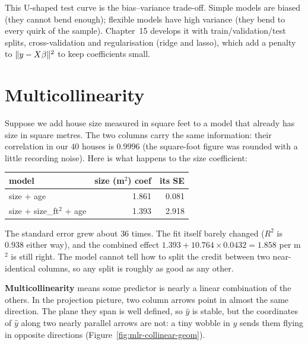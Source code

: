 \begin{connectionbox}
This U-shaped test curve is the bias--variance trade-off. Simple models are biased (they
cannot bend enough); flexible models have high variance (they bend to every quirk of the
sample). Chapter~15 develops it with train/validation/test splits, cross-validation and
regularisation (ridge and lasso), which add a penalty to $\lVert y - X\beta\rVert^2$ to keep
coefficients small.
\end{connectionbox}

\section{Multicollinearity}
\label{sec:mlr-collinear}

Suppose we add house size measured in square feet to a model that already has size in
square metres. The two columns carry the same information: their correlation in our
$40$ houses is $0.9996$ (the square-foot figure was rounded with a little recording
noise). Here is what happens to the size coefficient:

\begin{center}
\begin{tabular}{lrr}
\toprule
model & size (m$^2$) coef & its SE\\
\midrule
size + age & 1.861 & 0.081\\
size + size\_ft$^2$ + age & 1.393 & 2.918\\
\bottomrule
\end{tabular}
\end{center}

The standard error grew about $36$ times. The fit itself barely changed ($R^2$ is
$0.938$ either way), and the combined effect $1.393 + 10.764\times 0.0432 = 1.858$ per m$^2$
is still right. The model cannot tell how to split the credit between two
near-identical columns, so any split is roughly as good as any other.

\textbf{Multicollinearity} means some predictor is nearly a linear combination of the
others. In the projection picture, two column arrows point in almost the same direction.
The plane they span is well defined, so $\hat y$ is stable, but the coordinates of
$\hat y$ along two nearly parallel arrows are not: a tiny wobble in $y$ sends them flying
in opposite directions (Figure~\ref{fig:mlr-collinear-geom}).

